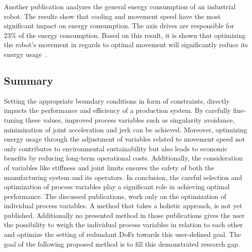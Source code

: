 Another publication analyzes the general energy consumption of an industrial robot. The results show that cooling and movement speed have the most significant impact on energy consumption. The axis drives are responsible for 23\% of the energy consumption. Based on this result, it is shown that optimizing the robot's movement in regards to optimal movement will significantly reduce its energy usage~\cite{Uhlmann.2016}. 




\subsection{Summary}
Setting the appropriate boundary conditions in form of constraints, directly impacts the performance and efficiency of a production system. By carefully fine-tuning these values, improved process variables such as singularity avoidance, minimization of joint acceleration and jerk can be achieved. Moreover, optimizing energy usage through the adjustment of variables related to movement speed not only contributes to environmental sustainability but also leads to economic benefits by reducing long-term operational costs. Additionally, the consideration of variables like stiffness and joint limits ensures the safety of both the manufacturing system and its operators.\newline %
In conclusion, the careful selection and optimization of process variables play a significant role in achieving optimal performance. The discussed publications, work only on the optimization of individual process variables. A method that takes a holistic approach, is not yet published. Additionally no presented method in those publications gives the user the possibility to weigh the individual process variables in relation to each other and optimize the setting of redundant \acrshort{DoF}s towards this user-defined goal. The goal of the following proposed method is to fill this demonstrated research gap.
